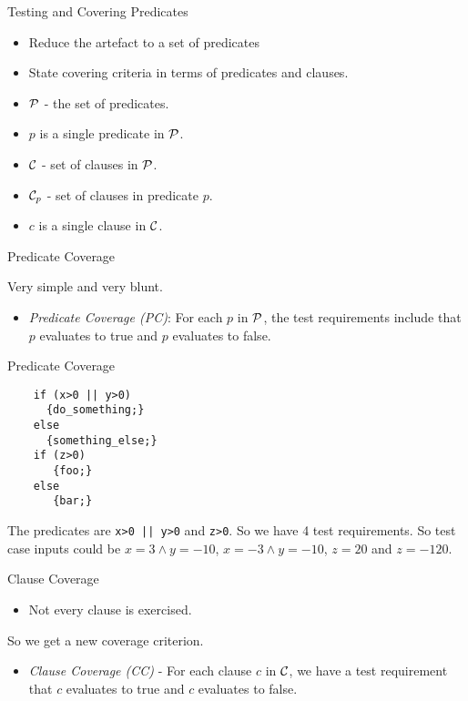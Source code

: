 \documentclass{beamer}
\newcommand{\predset}{{\cal P}}
\newcommand{\clauseset}{{\cal C}}
\begin{document}
\begin{frame}{Testing and Covering Predicates}
  \begin{itemize}
  \item Reduce the artefact to a set of predicates
  \item State covering criteria in terms of predicates and clauses.  
  \end{itemize}
  \begin{itemize}
  \item $\predset$ - the set of predicates.
  \item $p$ is a single predicate in $\predset$.
  \item $\clauseset$ - set of clauses in $\predset$.
  \item $\clauseset_p$ - set of clauses in predicate $p$.
   \item $c$ is a single clause in $\clauseset$.
  \end{itemize}
\end{frame}
\begin{frame}{Predicate Coverage}

Very simple and very blunt.
  \begin{itemize}
  \item {\em Predicate Coverage (PC)}: For each $p$ in $\predset$, the
    test requirements include that $p$ evaluates to true and $p$
    evaluates to false. 
  \end{itemize}

\end{frame}
\begin{frame}[fragile]{Predicate Coverage}

  \begin{lstlisting}
    if (x>0 || y>0) 
      {do_something;} 
    else
      {something_else;}
    if (z>0) 
       {foo;}
    else
       {bar;}
  \end{lstlisting}
The predicates are \verb+x>0 || y>0+ and \verb+z>0+. So we have 4 test
requirements. So test case inputs could be $x=3\land y=-10$,
$x=-3\land y=-10$, $z=20$ and $z=-120$.
\end{frame}
\begin{frame}{Clause Coverage}
  \begin{itemize}
  \item Not every clause is exercised. 
  \end{itemize}
So we get a new coverage criterion.
\begin{itemize}
\item {\em Clause Coverage (CC)} - For each clause $c$ in
  $\clauseset$, we have a test requirement that $c$ evaluates to true
  and $c$ evaluates to false.
\end{itemize}
\end{frame}
\end{document}

